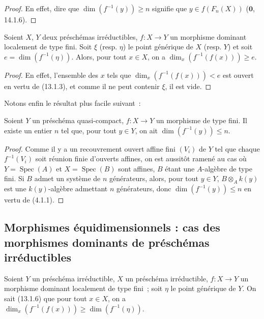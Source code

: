 \begin{proof}
En effet, dire que $\dim(f^{-1}(y))\geq n$ signifie que $y\in f(F_n(X))$
($\mathbf 0$, 14.1.6).
\end{proof}

\begin{corollary}[13.1.6]
\label{IV.13.1.6-fr}
Soient $X$, $Y$ deux préschémas irréductibles, $f:X\to Y$ un morphisme
dominant localement de type fini. Soit $\xi$ (resp. $\eta$) le point générique
de $X$ (resp. $Y$) et soit $e=\dim(f^{-1}(\eta))$. Alors, pour tout $x\in X$,
on a $\dim_x(f^{-1}(f(x)))\geq e$.
\end{corollary}

\begin{proof}
En effet, l'ensemble des $x$ tels que $\dim_x(f^{-1}(f(x)))<e$ est ouvert en
vertu de (13.1.3), et comme il ne peut contenir $\xi$, il est vide.
\end{proof}

Notons enfin le résultat plus facile suivant~:

\begin{proposition}[13.1.7]
\label{IV.13.1.7-fr}
Soient $Y$ un préschéma quasi-compact, $f:X\to Y$ un morphisme de type fini.
Il existe un entier $n$ tel que, pour tout $y\in Y$, on ait
$\dim(f^{-1}(y))\leq n$.
\end{proposition}

\begin{proof}
Comme il y a un recouvrement ouvert affine fini $(V_i)$ de $Y$ tel que chaque
$f^{-1}(V_i)$ soit réunion finie d'ouverts affines, on est aussitôt ramené au
cas où $Y=\operatorname{Spec}(A)$ et $X=\operatorname{Spec}(B)$ sont affines,
$B$ étant une $A$-algèbre de type fini. Si $B$ admet un système de $n$
générateurs, alors, pour tout $y\in Y$, $B\otimes_Ak(y)$ est une
$k(y)$-algèbre admettant $n$ générateurs, donc $\dim(f^{-1}(y))\leq n$ en
vertu de (4.1.1).
\end{proof}

\subsection{Morphismes équidimensionnels : cas des morphismes dominants de préschémas irréductibles}
\label{subsection:IV.13.2-fr}

\begin{env}[13.2.1]
\label{IV.13.2.1-fr}
Soient $Y$ un préschéma irréductible, $X$ un préschéma irréductible,
$f:X\to Y$ un morphisme dominant localement de type fini~; soit $\eta$ le
point générique de $Y$. On sait (13.1.6) que pour tout $x\in X$, on a
$\dim_x(f^{-1}(f(x)))\geq\dim(f^{-1}(\eta))$.
\end{env}

